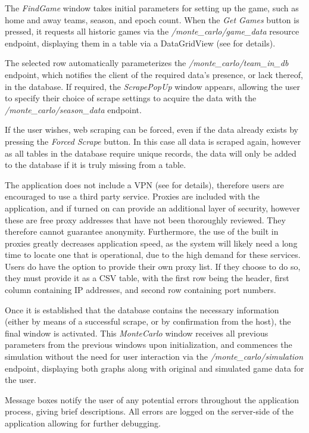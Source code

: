 \documentclass{thesis-ekf}
\theoremstyle{definition}
\theoremstyle{remark}
\begin{document}
The \emph{FindGame} window takes initial parameters for setting up the game, such as home and away teams, season, and epoch count. When the \emph{Get Games} button is pressed, it requests all historic games via the \emph{/monte\_carlo/game\_data} resource endpoint, displaying them in a table via a DataGridView (see \cite{dgv} for details).

The selected row automatically parameterizes the \emph{/monte\_carlo/team\_in\_db} endpoint, which notifies the client of the required data's presence, or lack thereof, in the database. If required, the \emph{ScrapePopUp} window appears, allowing the user to specify their choice of scrape settings to acquire the data with the \emph{/monte\_carlo/season\_data} endpoint. 

If the user wishes, web scraping can be forced, even if the data already exists by pressing the \emph{Forced Scrape} button. In this case all data is scraped again, however as all tables in the database require unique records, the data will only be added to the database if it is truly missing from a table.

The application does not include a VPN (see \cite{vpn} for details), therefore users are encouraged to use a third party service. Proxies are included with the application, and if turned on can provide an additional layer of security, however these are free proxy addresses that have not been thoroughly reviewed. They therefore cannot guarantee anonymity. Furthermore, the use of the built in proxies greatly decreases application speed, as the system will likely need a long time to locate one that is operational, due to the high demand for these services. Users do have the option to provide their own proxy list. If they choose to do so, they must provide it as a CSV table, with the first row being the header, first column containing IP addresses, and second row containing port numbers.

Once it is established that the database contains the necessary information (either by means of a successful scrape, or by confirmation from the host), the final window is activated. This \emph{MonteCarlo} window receives all previous parameters from the previous windows upon initialization, and commences the simulation without the need for user interaction via the \emph{/monte\_carlo/simulation} endpoint, displaying both graphs along with original and simulated game data for the user.

Message boxes notify the user of any potential errors throughout the application process, giving brief descriptions. All errors are logged on the server-side of the application allowing for further debugging.
\end{document}
